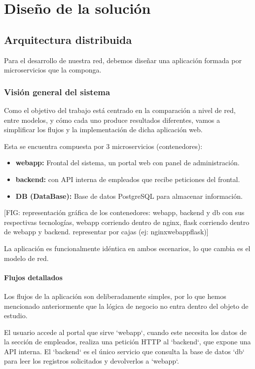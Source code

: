 \chapter{Diseño de la solución}
    \section{Arquitectura distribuida}
    Para el desarrollo de nuestra red, debemos diseñar una aplicación formada por microservicios que la componga.

        \subsection{Visión general del sistema}
        Como el objetivo del trabajo está centrado en la comparación a nivel de red, entre modelos, y cómo cada uno produce resultados diferentes, vamos a simplificar los flujos y la implementación de dicha aplicación web.

        Esta se encuentra compuesta por 3 microservicios (contenedores):
        \begin{itemize}
            \item \textbf{webapp:} Frontal del sistema, un portal web con panel de administración.
            \item \textbf{backend:} con API interna de empleados que recibe peticiones del frontal.
            \item \textbf{DB (DataBase):} Base de datos PostgreSQL para almacenar información.
        \end{itemize}

        [FIG: representación gráfica de los contenedores: webapp, backend y db con sus respectivas tecnologías, webapp corriendo dentro de nginx, flask corriendo dentro de webapp y backend. representar por cajas (ej: nginx{webapp{flask}})]

        La aplicación es funcionalmente idéntica en ambos escenarios, lo que cambia es el modelo de red.

        \subsubsection{Flujos detallados}
        Los flujos de la aplicación son deliberadamente simples, por lo que hemos mencionado anteriormente que la lógica de negocio no entra dentro del objeto de estudio. 
        
        El usuario accede al portal que sirve `webapp`, cuando este necesita los datos de la sección de empleados, realiza una petición HTTP al `backend`, que expone una API interna. El `backend` es el único servicio que consulta la base de datos `db` para leer los registros solicitados y devolverlos a `webapp`.

